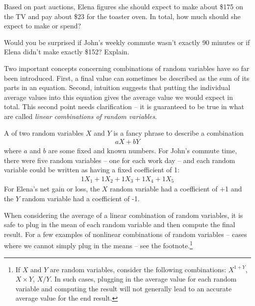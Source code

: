 \begin{exercisewrap}
\begin{nexercise}
Based on past auctions, Elena figures she should expect to make about \$175 on the TV and pay about \$23 for the toaster oven. In total, how much should she expect to make or spend?\footnotemark
\end{nexercise}
\end{exercisewrap}

\begin{exercisewrap}
\begin{nexercise} \label{explainWhyThereIsUncertaintyInTheSum}
Would you be surprised if John's weekly commute wasn't exactly 90 minutes or if Elena didn't make exactly \$152? Explain.\footnotemark
\end{nexercise}
\end{exercisewrap}

Two important concepts concerning combinations of random variables have so far been introduced. First, a final value can sometimes be described as the sum of its parts in an equation. Second, intuition suggests that putting the individual average values into this equation gives the average value we would expect in total. This second point needs clarification -- it is guaranteed to be true in what are called \emph{linear combinations of random variables}.

A  of two random variables $X$ and $Y$ is a fancy phrase to describe a combination
\begin{align*}
aX + bY
\end{align*}
where $a$ and $b$ are some fixed and known numbers. For John's commute time, there were five random variables -- one for each work day -- and each random variable could be written as having a fixed coefficient of 1:
\begin{align*}
1X_1 + 1 X_2 + 1 X_3 + 1 X_4 + 1 X_5
\end{align*}
For Elena's net gain or loss, the $X$ random variable had a coefficient of +1 and the $Y$ random variable had a coefficient of -1.

When considering the average of a linear combination of random variables, it is safe to plug in the mean of each random variable and then compute the final result. For a few examples of nonlinear combinations of random variables -- cases where we cannot simply plug in the means -- see the footnote.\footnote{If $X$ and $Y$ are random variables, consider the following combinations: $X^{1+Y}$, $X\times Y$, $X/Y$. In such cases, plugging in the average value for each random variable and computing the result will not generally lead to an accurate average value for the end result.}

